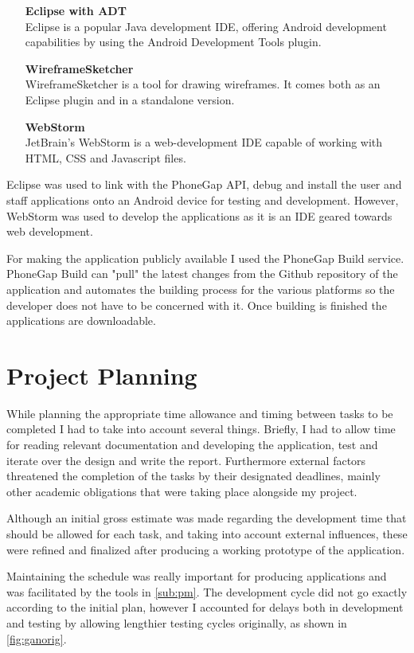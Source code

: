 \documentclass[12pt]{ecsproject}     %
\begin{document}
\begin{itemize}
\item[\textbf{Eclipse with ADT}] \hfill \\
Eclipse is a popular Java development IDE, offering Android development capabilities by using the Android Development Tools plugin.
\item[\textbf{WireframeSketcher}] \hfill \\
WireframeSketcher is a tool for drawing wireframes. It comes both as an Eclipse plugin and in a standalone version.
\item[\textbf{WebStorm}]\hfill \\
JetBrain's WebStorm is a web-development IDE capable of working with HTML, CSS and Javascript files. 
\end{itemize}

Eclipse was used to link with the PhoneGap API, debug and install the user and staff applications onto an Android device for testing and development. However, WebStorm was used to develop the applications as it is an IDE geared towards web development.

For making the application publicly available I used the PhoneGap Build service. PhoneGap Build can "pull" the latest changes from the Github repository of the application and automates the building process for the various platforms so the developer does not have to be concerned with it. Once building is finished the applications are downloadable.

\section{Project Planning}

While planning the appropriate time allowance and timing between tasks to be completed I had to take into account several things. Briefly, I had to allow time for reading relevant documentation and developing the application, test and iterate over the design and write the report. Furthermore external factors threatened the completion of the tasks by their designated deadlines, mainly other academic obligations that were taking place alongside my project. 

Although an initial gross estimate was made regarding the development time that should be allowed for each task, and taking into account external influences, these were refined and finalized after producing a working prototype of the application.

Maintaining the schedule was really important for producing applications and was facilitated by the tools in \ref{sub:pm}. The development cycle did not go exactly according to the initial plan, however I accounted for delays both in development and testing by allowing lengthier testing cycles originally, as shown in \ref{fig:ganorig}.
\end{document}
